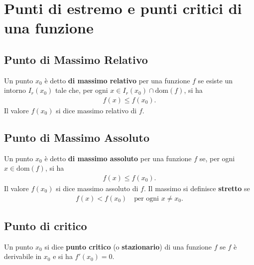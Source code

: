 \documentclass{book}
\begin{document}
\noindent\begin{minipage}{\textwidth}
    \section{Punti di estremo e punti critici di una funzione}

    \begin{definition}
        \subsection{Punto di Massimo Relativo}
        Un punto \( x_0 \) è detto \textbf{di massimo relativo} per una funzione \( f \) se esiste un intorno \( I_r(x_0) \) tale che, per ogni \( x \in I_r(x_0) \cap \text{dom}(f) \), si ha
        \begin{align*}
            f(x) \leq f(x_0).
        \end{align*}
        Il valore \( f(x_0) \) si dice massimo relativo di \( f \).
    \end{definition}

    \begin{definition}
        \subsection{Punto di Massimo Assoluto}
        Un punto \( x_0 \) è detto \textbf{di massimo assoluto} per una funzione \( f \) se, per ogni \( x \in \text{dom}(f) \), si ha
        \begin{align*}
            f(x) \leq f(x_0).
        \end{align*}
        Il valore \( f(x_0) \) si dice massimo assoluto di \( f \). Il massimo si definisce \textbf{stretto} se
        \begin{align*}
            f(x) < f(x_0) \quad \text{per ogni } x \neq x_0.
        \end{align*}
    \end{definition}

    \begin{definition}
        \subsection{Punto di critico}
        Un punto \( x_0 \) si dice \textbf{punto critico} (o \textbf{stazionario}) di una funzione \( f \) se \( f \) è derivabile in \( x_0 \) e si ha \( f'(x_0) = 0 \).
    \end{definition}


\end{minipage}
\end{document}
